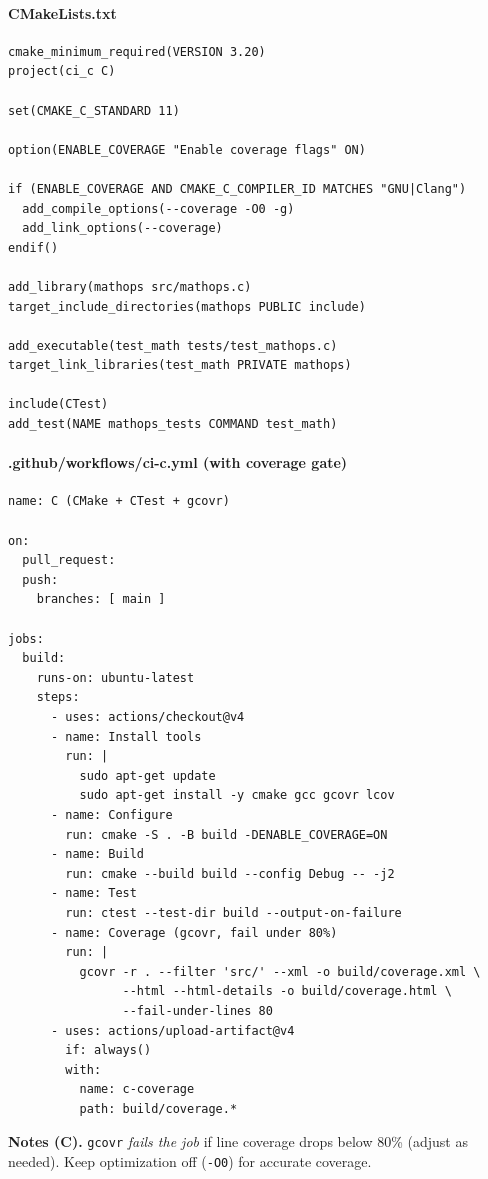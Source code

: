 \documentclass[11pt]{article}
\begin{document}
\paragraph{CMakeLists.txt}
\begin{verbatim}
cmake_minimum_required(VERSION 3.20)
project(ci_c C)

set(CMAKE_C_STANDARD 11)

option(ENABLE_COVERAGE "Enable coverage flags" ON)

if (ENABLE_COVERAGE AND CMAKE_C_COMPILER_ID MATCHES "GNU|Clang")
  add_compile_options(--coverage -O0 -g)
  add_link_options(--coverage)
endif()

add_library(mathops src/mathops.c)
target_include_directories(mathops PUBLIC include)

add_executable(test_math tests/test_mathops.c)
target_link_libraries(test_math PRIVATE mathops)

include(CTest)
add_test(NAME mathops_tests COMMAND test_math)
\end{verbatim}
\clearpage

\paragraph{.github/workflows/ci-c.yml (with coverage gate)}
\begin{verbatim}
name: C (CMake + CTest + gcovr)

on:
  pull_request:
  push:
    branches: [ main ]

jobs:
  build:
    runs-on: ubuntu-latest
    steps:
      - uses: actions/checkout@v4
      - name: Install tools
        run: |
          sudo apt-get update
          sudo apt-get install -y cmake gcc gcovr lcov
      - name: Configure
        run: cmake -S . -B build -DENABLE_COVERAGE=ON
      - name: Build
        run: cmake --build build --config Debug -- -j2
      - name: Test
        run: ctest --test-dir build --output-on-failure
      - name: Coverage (gcovr, fail under 80%)
        run: |
          gcovr -r . --filter 'src/' --xml -o build/coverage.xml \
                --html --html-details -o build/coverage.html \
                --fail-under-lines 80
      - uses: actions/upload-artifact@v4
        if: always()
        with:
          name: c-coverage
          path: build/coverage.*
\end{verbatim}

\begin{tcolorbox}
\textbf{Notes (C).} \texttt{gcovr} \emph{fails the job} if line coverage drops below 80\% (adjust as needed). Keep optimization off (\texttt{-O0}) for accurate coverage.
\end{tcolorbox}
\clearpage
\end{document}
